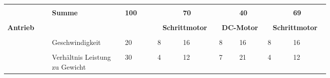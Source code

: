 \documentclass[main.tex]{subfiles} %
\begin{document}
\begin{landscape}
\begin{table}[H]
\begin{tabular}{|p{0.11\linewidth}|p{0.18\linewidth}|p{0.085\linewidth}|p{0.057\linewidth}|p{0.07\linewidth}|p{0.057\linewidth}|p{0.07\linewidth}|p{0.057\linewidth}|p{0.07\linewidth}|}
            \cline{2-9}
                                                      &                                     &                                            &                                           &                                            &            &             &            &             \\[-9pt]
                                                      & \textbf{Summe}                      & \textbf{100}                               &                                           & \textbf{70}                                &            & \textbf{40} &            & \textbf{69} \\[1pt]
            \hline
            \hline
                                                      & \multicolumn{2}{c|}{}               & \multicolumn{2}{c|}{}                      & \multicolumn{2}{c|}{}                     & \multicolumn{2}{c|}{}                                                                            \\[-9pt]
            \multirow{6}{4em}{\textbf{Antrieb}}       & \multicolumn{2}{c|}{}               & \multicolumn{2}{c|}{\textbf{Schrittmotor}} & \multicolumn{2}{c|}{\textbf{DC-Motor}}    & \multicolumn{2}{c|}{\textbf{Schrittmotor}}                                                       \\[1pt]
            \cline{2-9}
                                                      &                                     &                                            &                                           &                                            &            &             &            &             \\[-9pt]
                                                      & Geschwindigkeit                     & 20                                         & 8                                         & 16                                         & 8          & 16          & 8          & 16          \\[1pt]
            \cline{2-9}
                                                      &                                     &                                            &                                           &                                            &            &             &            &             \\[-9pt]
                                                      & Verhältnis Leistung zu Gewicht      & 30                                         & 4                                         & 12                                         & 7          & 21          & 4          & 12          \\[1pt]

\end{tabular}
\end{table}
\end{landscape}
\end{document}
